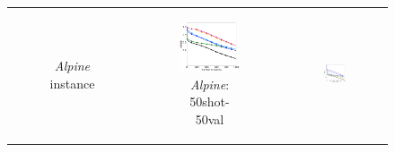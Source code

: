 \begin{figure}[t]
\begin{tabular}[c]{ccc}
\begin{subfigure}[t]{0.32\textwidth}
			\caption{\small \textit{Alpine} instance} \label{fig:Alpine-ins}
		\end{subfigure} 
		&
		\begin{subfigure}[t]{0.32\textwidth}
			\centering
			\includegraphics[width=\textwidth]{./figs/new/Alpine2D-50shot-50query-200inners-eps-converted-to.pdf}
			\caption{\small \textit{Alpine}: 50shot-50val}
		\end{subfigure} 
		&
		\begin{subfigure}[t]{0.32\textwidth}
			\centering
			\includegraphics[width=\textwidth]{./figs/new/Alpine2D-100shot-100query-500inners-eps-converted-to.pdf}

\end{subfigure}
\end{tabular}
\end{figure}
